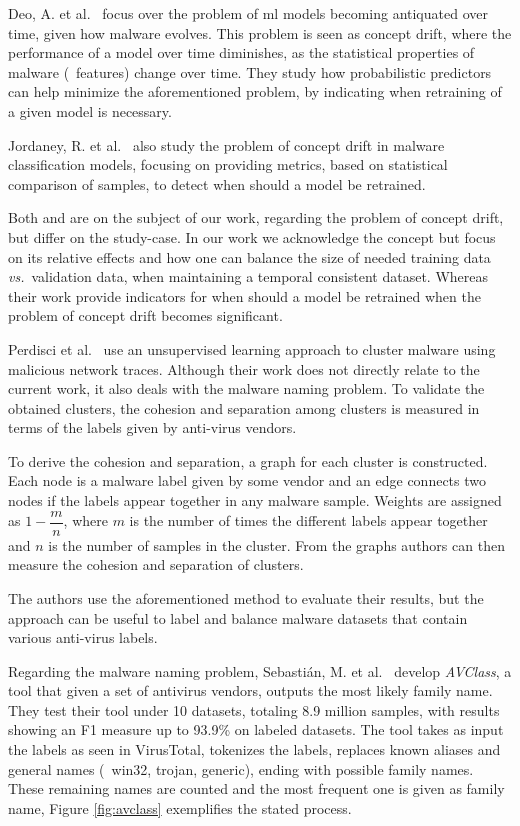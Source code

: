 Deo, A. et al.~\cite{deo2016prescience} focus over the problem of \gls{ml} models becoming antiquated over time, given how malware evolves.
This problem is seen as concept drift, where the performance of a model over time diminishes, as the statistical properties of malware (\ie\ features) change over time.
They study how probabilistic predictors can help minimize the aforementioned problem, by indicating when retraining of a given model is necessary. 

Jordaney, R. et al.~\cite{jordaney2017transcend} also study the problem of concept drift in malware classification models, focusing on providing metrics, based on statistical comparison of samples, to detect when should a model be retrained. 

Both \cite{deo2016prescience} and \cite{jordaney2017transcend} are on the subject of our work, regarding the problem of concept drift, but differ on the study-case.
In our work we acknowledge the concept but focus on its relative effects and how one can balance the size of needed training data \textit{vs.}\ validation data, when maintaining a temporal consistent dataset.
Whereas their work provide indicators for when should a model be retrained when the problem of concept drift becomes significant.

\medskip

Perdisci et al.~\cite{perdisci:behavior} use an unsupervised learning approach to cluster malware using malicious network traces.
Although their work does not directly relate to the current work, it also deals with the malware naming problem.
To validate the obtained clusters, the cohesion and separation among clusters is measured in terms of the labels given by anti-virus vendors.

To derive the cohesion and separation, a graph for each cluster is constructed.
Each node is a malware label given by some vendor and an edge connects two nodes if the labels appear together in any malware sample.
Weights are assigned as $1 - \dfrac{m}{n}$, where $m$ is the number of times the different labels appear together and $n$ is the number of samples in the cluster.
From the graphs authors can then measure the cohesion and separation of clusters.

The authors use the aforementioned method to evaluate their results, but the approach can be useful to label and balance malware datasets that contain various anti-virus labels.

\medskip

Regarding the malware naming problem, Sebastián, M. et al.~\cite{sebastian2016avclass} develop \textit{AVClass}, a tool that given a set of antivirus vendors, outputs the most likely family name.
They test their tool under 10 datasets, totaling 8.9 million samples, with results showing an F1 measure up to 93.9\% on labeled datasets.
The tool takes as input the labels as seen in VirusTotal, tokenizes the labels, replaces known aliases and general names (\eg\ win32, trojan, generic), ending with possible family names. These remaining names are counted and the most frequent one is given as family name, Figure \ref{fig:avclass} exemplifies the stated process.

